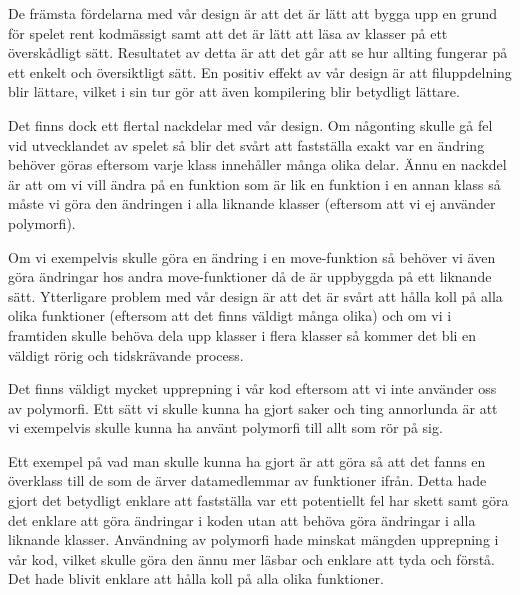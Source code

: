 \documentclass{TDP005mall}
\begin{document}
De främsta fördelarna med vår design är att det är lätt att bygga upp en grund för spelet rent kodmässigt samt att det är lätt att läsa av klasser på ett överskådligt sätt. Resultatet av detta är att det går att se hur allting fungerar på ett enkelt och översiktligt sätt. En positiv effekt av vår design är att filuppdelning blir lättare, vilket i sin tur gör att även kompilering blir betydligt lättare.

Det finns dock ett flertal nackdelar med vår design. Om någonting skulle gå fel vid utvecklandet av spelet så blir det svårt att fastställa exakt var en ändring behöver göras eftersom varje klass innehåller många olika delar. Ännu en nackdel är att om vi vill ändra på en funktion som är lik en funktion i en annan klass så måste vi göra den ändringen i alla liknande klasser (eftersom att vi ej använder polymorfi). 

Om vi exempelvis skulle göra en ändring i en move-funktion så behöver vi även göra ändringar hos andra move-funktioner då de är uppbyggda på ett liknande sätt. Ytterligare problem med vår design är att det är svårt att hålla koll på alla olika funktioner (eftersom att det finns väldigt många olika) och om vi i framtiden skulle behöva dela upp klasser i flera klasser så kommer det bli en väldigt rörig och tidskrävande process.

Det finns väldigt mycket upprepning i vår kod eftersom att vi inte använder oss av polymorfi. Ett sätt vi skulle kunna ha gjort saker och ting annorlunda är att vi exempelvis skulle kunna ha använt polymorfi till allt som rör på sig. 

Ett exempel på vad man skulle kunna ha gjort är att göra så att det fanns en överklass till de som de ärver datamedlemmar av funktioner ifrån. Detta hade gjort det betydligt enklare att fastställa var ett potentiellt fel har skett samt göra det enklare att göra ändringar i koden utan att behöva göra ändringar i alla liknande klasser. Användning av polymorfi hade minskat mängden upprepning i vår kod, vilket skulle göra den ännu mer läsbar och enklare att tyda och förstå. Det hade blivit enklare att hålla koll på alla olika funktioner. 
\end{document}
